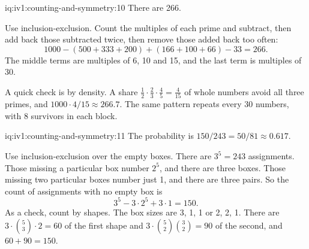 \enlargethispage{-5\baselineskip}%
\begin{solution}{iq:iv1:counting-and-symmetry:10}
There are 266.

Use inclusion-exclusion. Count the multiples of each prime and subtract, then add back those subtracted twice, then remove those added back too often:
\[
1000 - (500 + 333 + 200) + (166 + 100 + 66) - 33 = 266.
\]
The middle terms are multiples of 6, 10 and 15, and the last term is multiples of 30.

A quick check is by density. A share $\tfrac12 \cdot \tfrac23 \cdot \tfrac45 = \tfrac{4}{15}$ of whole numbers avoid all three primes, and $1000 \cdot 4/15 \approx 266.7$. The same pattern repeats every 30 numbers, with 8 survivors in each block.

\end{solution}

\begin{solution}{iq:iv1:counting-and-symmetry:11}
The probability is $150/243 = 50/81 \approx 0.617$.

Use inclusion-exclusion over the empty boxes. There are $3^5 = 243$ assignments. Those missing a particular box number $2^5$, and there are three boxes. Those missing two particular boxes number just 1, and there are three pairs. So the count of assignments with no empty box is
\[
3^5 - 3 \cdot 2^5 + 3 \cdot 1 = 150.
\]
As a check, count by shapes. The box sizes are 3, 1, 1 or 2, 2, 1. There are $3 \cdot \binom{5}{3} \cdot 2 = 60$ of the first shape and $3 \cdot \binom{5}{2}\binom{3}{2} = 90$ of the second, and $60 + 90 = 150$.

\end{solution}

